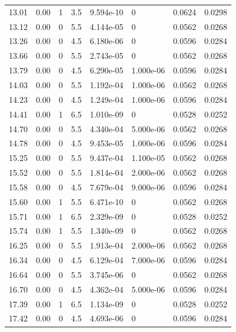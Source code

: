 \documentclass[preview]{standalone}
\begin{document}
{{{\begin{tabular}{L{1.2cm}C{1.2cm} C{0.3cm}C{0.5cm} C{1.4cm}C{1.4cm} C{1.4cm}C{1.4cm}}
  13.01  &  0.00  & 1     & 3.5 &  9.594e-10  & 0  & 0.0624 &  0.0298   \\ 
  13.12  &  0.00  & 0     & 5.5 &  4.144e-05  & 0  & 0.0562 &  0.0268   \\ 
  13.26  &  0.00  & 0     & 4.5 &  6.180e-06  & 0  & 0.0596 &  0.0284   \\ 
  13.66  &  0.00  & 0     & 5.5 &  2.743e-05  & 0  & 0.0562 &  0.0268   \\ 
  13.79  &  0.00  & 0     & 4.5 &  6.290e-05  & 1.000e-06  & 0.0596 &  0.0284   \\ 
  14.03  &  0.00  & 0     & 5.5 &  1.192e-04  & 1.000e-06  & 0.0562 &  0.0268   \\ 
  14.23  &  0.00  & 0     & 4.5 &  1.249e-04  & 1.000e-06  & 0.0596 &  0.0284   \\ 
  14.41  &  0.00  & 1     & 6.5 &  1.010e-09  & 0  & 0.0528 &  0.0252   \\ 
  14.70  &  0.00  & 0     & 5.5 &  4.340e-04  & 5.000e-06  & 0.0562 &  0.0268   \\ 
  14.78  &  0.00  & 0     & 4.5 &  9.453e-05  & 1.000e-06  & 0.0596 &  0.0284   \\ 
  15.25  &  0.00  & 0     & 5.5 &  9.437e-04  & 1.100e-05  & 0.0562 &  0.0268   \\ 
  15.52  &  0.00  & 0     & 5.5 &  1.814e-04  & 2.000e-06  & 0.0562 &  0.0268   \\ 
  15.58  &  0.00  & 0     & 4.5 &  7.679e-04  & 9.000e-06  & 0.0596 &  0.0284   \\ 
  15.60  &  0.00  & 1     & 5.5 &  6.471e-10  & 0  & 0.0562 &  0.0268   \\ 
  15.71  &  0.00  & 1     & 6.5 &  2.329e-09  & 0  & 0.0528 &  0.0252   \\ 
  15.74  &  0.00  & 1     & 5.5 &  1.340e-09  & 0  & 0.0562 &  0.0268   \\ 
  16.25  &  0.00  & 0     & 5.5 &  1.913e-04  & 2.000e-06  & 0.0562 &  0.0268   \\ 
  16.34  &  0.00  & 0     & 4.5 &  6.129e-04  & 7.000e-06  & 0.0596 &  0.0284   \\ 
  16.64  &  0.00  & 0     & 5.5 &  3.745e-06  & 0  & 0.0562 &  0.0268   \\ 
  16.70  &  0.00  & 0     & 4.5 &  4.362e-04  & 5.000e-06  & 0.0596 &  0.0284   \\ 
  17.39  &  0.00  & 1     & 6.5 &  1.134e-09  & 0  & 0.0528 &  0.0252   \\ 
  17.42  &  0.00  & 0     & 4.5 &  4.693e-06  & 0  & 0.0596 &  0.0284   \\ 

\end{tabular}}}}
\end{document}
